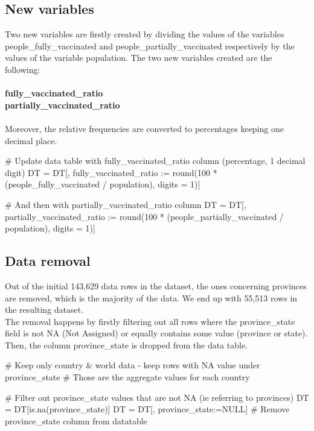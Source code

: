 \subsection{New variables}
Two new variables are firstly created by dividing the values of the variables people\_fully\_vaccinated and people\_partially\_vaccinated respectively by the values of the variable population. The two new variables created are the following: \\ \\
\textbf{fully\_vaccinated\_ratio}
\\
\textbf{partially\_vaccinated\_ratio}
\\ \\
Moreover, the relative frequencies are converted to percentages keeping one decimal place.

\begin{Rcode}{\scriptsize}
# Update data table with fully\_vaccinated\_ratio column (percentage, 1 decimal digit)
DT = DT[, fully_vaccinated_ratio := round(100 * 
(people_fully_vaccinated / population), digits = 1)]

# And then with partially\_vaccinated\_ratio column
DT = DT[, partially_vaccinated_ratio := round(100 * 
(people_partially_vaccinated / population), digits = 1)]
\end{Rcode}


\subsection{Data removal}
Out of the initial 143,629 data rows in the dataset, the ones concerning provinces are removed, which is the majority of the data. We end up with 55,513 rows in the resulting dataset. \\
The removal happens by firstly filtering out all rows where the province\_state field is not NA (Not Assigned) or equally contains some value (province or state). Then, the column province\_state is dropped from the data table.

\begin{Rcode}{\scriptsize}
# Keep only country & world data - keep rows with NA value under province\_state
# Those are the aggregate values for each country

# Filter out province\_state values that are not NA (ie referring to provinces)
DT = DT[is.na(province_state)] 
DT = DT[, province_state:=NULL] # Remove province\_state column from datatable 
\end{Rcode}
\\

